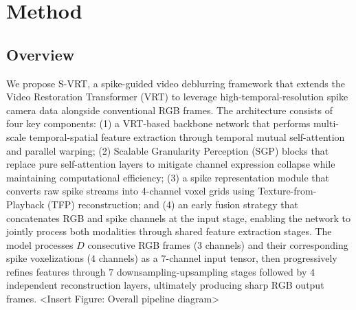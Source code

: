 \documentclass[conference]{IEEEtran}
\begin{document}
\section{Method}

\subsection{Overview}
We propose S-VRT, a spike-guided video deblurring framework that extends the Video Restoration Transformer (VRT) \cite{liang_vrt_2022} to leverage high-temporal-resolution spike camera data alongside conventional RGB frames. The architecture consists of four key components: (1) a VRT-based backbone network that performs multi-scale temporal-spatial feature extraction through temporal mutual self-attention and parallel warping; (2) Scalable Granularity Perception (SGP) blocks that replace pure self-attention layers to mitigate channel expression collapse while maintaining computational efficiency; (3) a spike representation module that converts raw spike streams into 4-channel voxel grids using Texture-from-Playback (TFP) reconstruction; and (4) an early fusion strategy that concatenates RGB and spike channels at the input stage, enabling the network to jointly process both modalities through shared feature extraction stages. The model processes $D$ consecutive RGB frames ($3$ channels) and their corresponding spike voxelizations ($4$ channels) as a $7$-channel input tensor, then progressively refines features through $7$ downsampling-upsampling stages followed by $4$ independent reconstruction layers, ultimately producing sharp RGB output frames.
<Insert Figure: Overall pipeline diagram>
\end{document}
